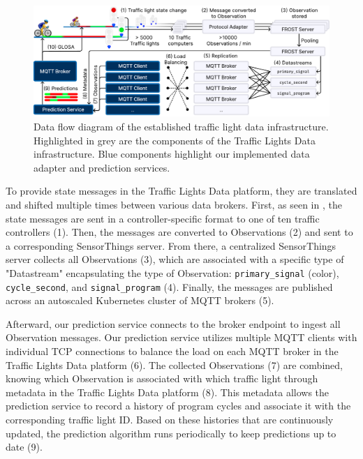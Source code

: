 \begin{figure}[t]
\centering
\includegraphics[width=\linewidth]{images/traffic-light-data-infrastructure.pdf}
\caption{Data flow diagram of the established traffic light data infrastructure. Highlighted in grey are the components of the Traffic Lights Data infrastructure. Blue components highlight our implemented data adapter and prediction services.}
\label{fig:traffic-light-data-infrastructure}
\end{figure}

To provide state messages in the Traffic Lights Data platform, they are translated and shifted multiple times between various data brokers. First, as seen in , the state messages are sent in a controller-specific format to one of ten traffic controllers (1). Then, the messages are converted to Observations (2) and sent to a corresponding SensorThings server. From there, a centralized SensorThings server collects all Observations (3), which are associated with a specific type of "Datastream" encapsulating the type of Observation: \texttt{primary\_signal} (color), \texttt{cycle\_second}, and \texttt{signal\_program} (4). Finally, the messages are published across an autoscaled Kubernetes cluster of MQTT brokers (5). 

Afterward, our prediction service connects to the broker endpoint to ingest all Observation messages. Our prediction service utilizes multiple MQTT clients with individual TCP connections to balance the load on each MQTT broker in the Traffic Lights Data platform (6). The collected Observations (7) are combined, knowing which Observation is associated with which traffic light through metadata in the Traffic Lights Data platform (8). This metadata allows the prediction service to record a history of program cycles and associate it with the corresponding traffic light ID. Based on these histories that are continuously updated, the prediction algorithm runs periodically to keep predictions up to date (9). 

